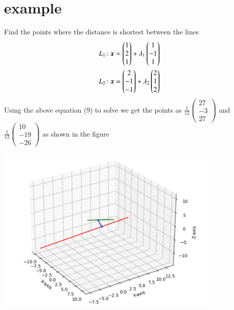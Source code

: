 \documentclass[journal,12pt,twocolumn]{IEEEtran}
\begin{document}
\section{example}
Find the points where the distance is shortest between the lines \\
\begin{align}
    L_1\colon \bm{x}= \begin{pmatrix}1\\2\\1\end{pmatrix}+\lambda_1\begin{pmatrix}1\\-1\\1\end{pmatrix}\notag\\
    L_2\colon \bm{x}= \begin{pmatrix}2\\-1\\-1\end{pmatrix}+\lambda_2\begin{pmatrix}2\\1\\2\end{pmatrix}\notag
\end{align}
Using the above equation (9) to solve we get the points as $\frac{1}{12}\begin{pmatrix}27\\-3\\27\end{pmatrix}$ and $\frac{1}{12}\begin{pmatrix}10\\-19\\-26\end{pmatrix}$ as shown in the figure\\
\begin{center}
    \includegraphics[width=11cm]{assignment2.jpg}
\end{center}
\end{document}
